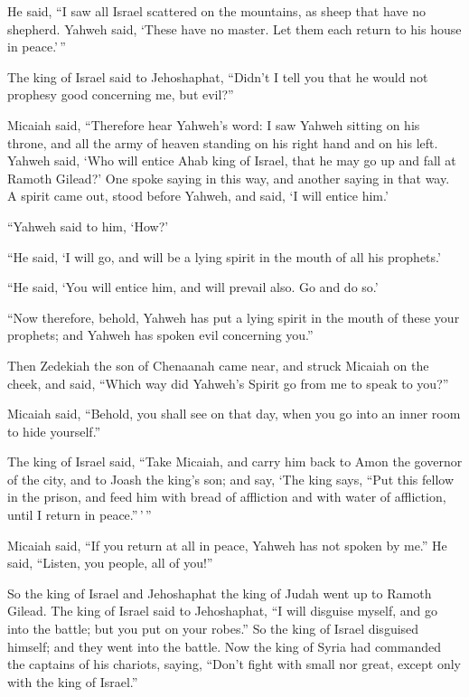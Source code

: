  He said, ``I saw all Israel scattered on the mountains,
as sheep that have no shepherd. Yahweh said, `These have no master. Let
them each return to his house in peace.'\,''

 The king of Israel said to Jehoshaphat, ``Didn't I tell
you that he would not prophesy good concerning me, but evil?''

 Micaiah said, ``Therefore hear Yahweh's word: I saw
Yahweh sitting on his throne, and all the army of heaven standing on his
right hand and on his left.  Yahweh said, `Who will
entice Ahab king of Israel, that he may go up and fall at Ramoth
Gilead?' One spoke saying in this way, and another saying in that way.
 A spirit came out, stood before Yahweh, and said, `I
will entice him.'

``Yahweh said to him, `How?'

 ``He said, `I will go, and will be a lying spirit in the
mouth of all his prophets.'

``He said, `You will entice him, and will prevail also. Go and do so.'

 ``Now therefore, behold, Yahweh has put a lying spirit
in the mouth of these your prophets; and Yahweh has spoken evil
concerning you.''

 Then Zedekiah the son of Chenaanah came near, and struck
Micaiah on the cheek, and said, ``Which way did Yahweh's Spirit go from
me to speak to you?''

 Micaiah said, ``Behold, you shall see on that day, when
you go into an inner room to hide yourself.''

 The king of Israel said, ``Take Micaiah, and carry him
back to Amon the governor of the city, and to Joash the king's son;
 and say, `The king says, ``Put this fellow in the
prison, and feed him with bread of affliction and with water of
affliction, until I return in peace.''\,'\,''

 Micaiah said, ``If you return at all in peace, Yahweh
has not spoken by me.'' He said, ``Listen, you people, all of you!''

 So the king of Israel and Jehoshaphat the king of Judah
went up to Ramoth Gilead.  The king of Israel said to
Jehoshaphat, ``I will disguise myself, and go into the battle; but you
put on your robes.'' So the king of Israel disguised himself; and they
went into the battle.  Now the king of Syria had
commanded the captains of his chariots, saying, ``Don't fight with small
nor great, except only with the king of Israel.''

